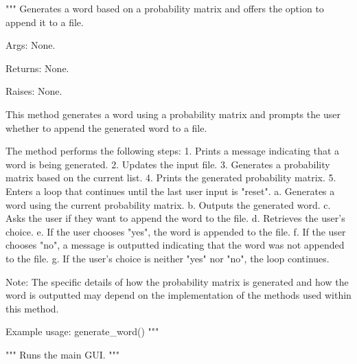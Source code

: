 \begin{codebox}
"""
Generates a word based on a probability matrix and offers the option to append it to a file.

Args:
    None.

Returns:
    None.

Raises:
    None.

This method generates a word using a probability matrix and prompts the user whether to append the generated word
to a file.

The method performs the following steps:
	1. Prints a message indicating that a word is being generated.
	2. Updates the input file.
	3. Generates a probability matrix based on the current list.
	4. Prints the generated probability matrix.
	5. Enters a loop that continues until the last user input is "reset".
	    a. Generates a word using the current probability matrix.
	    b. Outputs the generated word.
	    c. Asks the user if they want to append the word to the file.
	    d. Retrieves the user's choice.
	    e. If the user chooses "yes", the word is appended to the file.
	    f. If the user chooses "no", a message is outputted indicating that the word was not appended to the file.
	    g. If the user's choice is neither "yes" nor "no", the loop continues.

Note: The specific details of how the probability matrix is generated and how the word is outputted may depend on
the implementation of the methods used within this method.

Example usage:
    generate_word()
"""
\end{codebox}

\begin{codebox}
"""
Runs the main GUI.
"""
\end{codebox}




